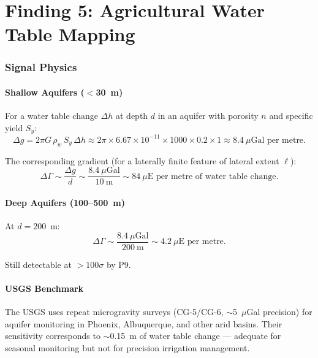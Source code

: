 \documentclass[11pt]{article}
\theoremstyle{definition}
\theoremstyle{remark}
\newcommand{\ee}[1]{\times10^{#1}}
\begin{document}
\part{Finding 5: Agricultural Water Table Mapping}
\label{part:water}

\section{Signal Physics}

\subsection{Shallow Aquifers ($<$30~m)}

For a water table change $\Delta h$ at depth $d$ in an aquifer with
porosity $n$ and specific yield $S_y$:
\begin{equation}
  \Delta g = 2\pi G \, \rho_w \, S_y \, \Delta h
  \approx 2\pi \times 6.67\ee{-11} \times 1000 \times 0.2 \times 1
  \approx 8.4~\mu\text{Gal per metre}.
\end{equation}

The corresponding gradient (for a laterally finite feature of
lateral extent $\ell$):
\begin{equation}
  \Delta\Gamma \sim \frac{\Delta g}{d} \sim \frac{8.4~\mu\text{Gal}}{10~\text{m}}
  \sim 84~\mu\text{E per metre of water table change}.
\end{equation}

\subsection{Deep Aquifers (100--500~m)}

At $d = 200$~m:
\begin{equation}
  \Delta\Gamma \sim \frac{8.4~\mu\text{Gal}}{200~\text{m}}
  \sim 4.2~\mu\text{E per metre}.
\end{equation}

Still detectable at $>100\sigma$ by P9.

\subsection{USGS Benchmark}

The USGS uses repeat microgravity surveys (CG-5/CG-6, $\sim$5~$\mu$Gal
precision) for aquifer monitoring in Phoenix, Albuquerque, and other
arid basins. Their sensitivity corresponds to $\sim$0.15~m of water
table change --- adequate for seasonal monitoring but not for
precision irrigation management.
\end{document}
